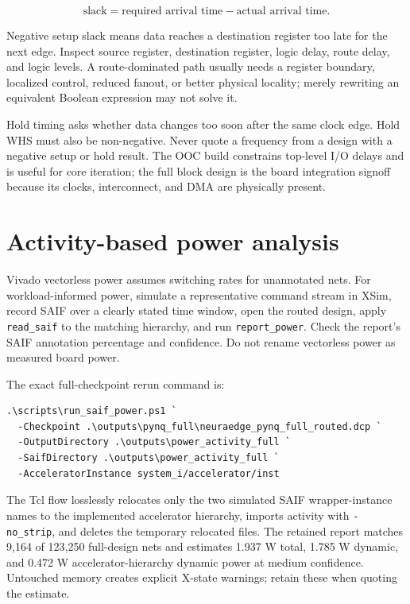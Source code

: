 \documentclass[10pt]{article}
\begin{document}
\[
  \text{slack}=\text{required arrival time}-\text{actual arrival time}.
\]

Negative setup slack means data reaches a destination register too late for the
next edge. Inspect source register, destination register, logic delay, route
delay, and logic levels. A route-dominated path usually needs a register
boundary, localized control, reduced fanout, or better physical locality; merely
rewriting an equivalent Boolean expression may not solve it.

Hold timing asks whether data changes too soon after the same clock edge. Hold
WHS must also be non-negative. Never quote a frequency from a design with a
negative setup or hold result. The OOC build constrains top-level I/O delays and
is useful for core iteration; the full block design is the board integration
signoff because its clocks, interconnect, and DMA are physically present.

\section{Activity-based power analysis}

Vivado vectorless power assumes switching rates for unannotated nets. For
workload-informed power, simulate a representative command stream in XSim,
record SAIF over a clearly stated time window, open the routed design, apply
\texttt{read\_saif} to the matching hierarchy, and run
\texttt{report\_power}. Check the report's SAIF annotation percentage and
confidence. Do not rename vectorless power as measured board power.

The exact full-checkpoint rerun command is:

\begin{lstlisting}
.\scripts\run_saif_power.ps1 `
  -Checkpoint .\outputs\pynq_full\neuraedge_pynq_full_routed.dcp `
  -OutputDirectory .\outputs\power_activity_full `
  -SaifDirectory .\outputs\power_activity_full `
  -AcceleratorInstance system_i/accelerator/inst
\end{lstlisting}

The Tcl flow losslessly relocates only the two simulated SAIF wrapper-instance
names to the implemented accelerator hierarchy, imports activity with
\texttt{-no\_strip}, and deletes the temporary relocated files. The retained
report matches 9,164 of 123,250 full-design nets and estimates 1.937 W total,
1.785 W dynamic, and 0.472 W accelerator-hierarchy dynamic power at medium
confidence. Untouched memory creates explicit X-state warnings; retain these
when quoting the estimate.
\end{document}
